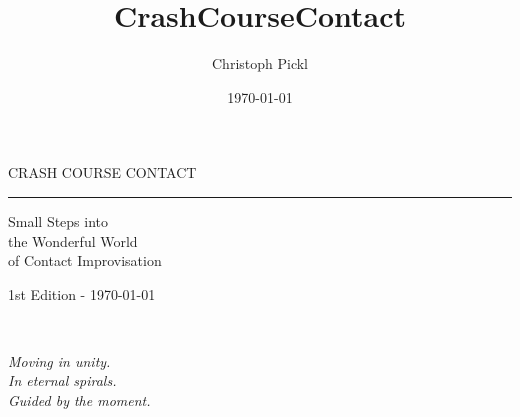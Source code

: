 \documentclass[a5paper,11pt]{book}
\title{CrashCourseContact}
\date{\today}
\author{Christoph Pickl}
\begin{document}
\begin{titlepage}
\begin{center}
	
	\vspace*{\fill}
	
	\fontsize{22}{0}\selectfont
    {\sffamily CRASH COURSE CONTACT}
	\vskip 5mm
	\rule{84mm}{0.4pt}
	\vskip 1mm
	\fontsize{15}{22}\selectfont
	{\sffamily Small Steps into \\ the Wonderful World \\ of Contact Improvisation}
	
	\vskip 70mm
	
	\vspace*{\fill}

	\fontsize{9}{0}\selectfont
	{\sffamily 1st Edition - \today}
\end{center}
\end{titlepage}

\pagestyle{empty}


\setcounter{tocdepth}{0} %
\tableofcontents


\clearpage
\ifodd\value{page}\else
  \thispagestyle{empty}
\fi

\pagestyle{fancy}

~

\vfill
\begin{center}
	\textit{Moving in unity.}\\
	\textit{In eternal spirals.}\\
	\textit{Guided by the moment.}
\end{center}
\vfill
\newpage











\printglossaries
\end{document}
